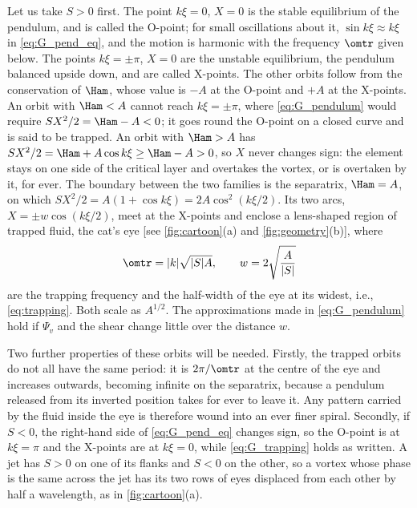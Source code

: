 Let us take \(S > 0\) first. The point \(k\xi = 0\), \(X = 0\) is the stable equilibrium of the pendulum, and is called the O-point; for small oscillations about it, \(\sin k\xi\approx k\xi\) in \cref{eq:G_pend_eq}, and the motion is harmonic with the frequency \(\omtr\) given below. The points \(k\xi = \pm\pi\), \(X = 0\) are the unstable equilibrium, the pendulum balanced upside down, and are called X-points. The other orbits follow from the conservation of \(\Ham\), whose value is \(-A\) at the O-point and \(+A\) at the X-points. An orbit with \(\Ham < A\) cannot reach \(k\xi = \pm\pi\), where \cref{eq:G_pendulum} would require \(SX^2/2 = \Ham - A < 0\); it goes round the O-point on a closed curve and is said to be trapped. An orbit with \(\Ham > A\) has \(SX^2/2 = \Ham + A\cos k\xi \geq \Ham - A > 0\), so \(X\) never changes sign: the element stays on one side of the critical layer and overtakes the vortex, or is overtaken by it, for ever. The boundary between the two families is the separatrix, \(\Ham = A\), on which \(SX^2/2 = A(1 + \cos k\xi) = 2A\cos^2(k\xi/2)\). Its two arcs, \(X = \pm w\cos(k\xi/2)\), meet at the X-points and enclose a lens-shaped region of trapped fluid, the cat's eye [see \cref{fig:cartoon}(a) and \cref{fig:geometry}(b)], where
\begin{equation}
\omtr = |k|\sqrt{|S|A},
\qquad
w = 2\sqrt{\frac{A}{|S|}}
\label{eq:G_trapping}
\end{equation}
are the trapping frequency and the half-width of the eye at its widest, i.e., \cref{eq:trapping}. Both scale as \(A^{1/2}\). The approximations made in \cref{eq:G_pendulum} hold if \(\Psi_v\) and the shear change little over the distance \(w\).

Two further properties of these orbits will be needed. Firstly, the trapped orbits do not all have the same period: it is \(2\pi/\omtr\) at the centre of the eye and increases outwards, becoming infinite on the separatrix, because a pendulum released from its inverted position takes for ever to leave it. Any pattern carried by the fluid inside the eye is therefore wound into an ever finer spiral. Secondly, if \(S < 0\), the right-hand side of \cref{eq:G_pend_eq} changes sign, so the O-point is at \(k\xi = \pi\) and the X-points are at \(k\xi = 0\), while \cref{eq:G_trapping} holds as written. A jet has \(S > 0\) on one of its flanks and \(S < 0\) on the other, so a vortex whose phase is the same across the jet has its two rows of eyes displaced from each other by half a wavelength, as in \cref{fig:cartoon}(a).

